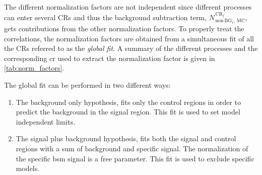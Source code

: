 The different normalization factors are not independent since different
processes can enter several CRs and thus the background subtraction term,
$N_{\mathrm{\, non~BG}_i,~\mathrm{MC}}^{\mathrm{\, CR}_j}$, gets contributions
from the other normalization factors. To properly treat the correlations, the
normalization factors are obtained from a simultaneous fit of all the CRs
referred to as the \emph{global fit}. A summary of the different processes and
the corresponding \gls{cr} used to extract the normalization factor is given in
\cref{tab:norm_factors}.

The global fit can be performed in two different ways:
\begin{enumerate}
\item The background only hypothesis, fits only the control regions in order to
  predict the background in the signal region. This fit is used to set model
  independent limits.
\item The signal plus background hypothesis, fits both the signal and control
  regions with a sum of background and specific signal. The normalization of the
  specific \gls{bsm} signal is a free parameter. This fit is used to exclude
  specific models.
\end{enumerate}
\begin{table}[!th]
  \centering
  \caption{Summary table of the different background processes and the
    corresponding control regions used to evaluate the bin dependent
    normalization factors.}
  \label{tab:norm_factors}
\end{table}

